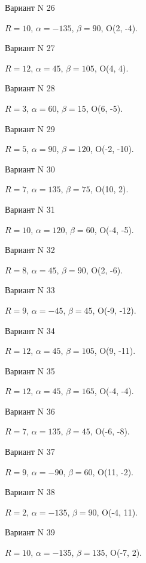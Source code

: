 \documentclass[11pt]{report}
\begin{document}
Вариант N 26

$R = 10$, $\alpha = -135$, $\beta = 90$, O(2, -4).



Вариант N 27

$R = 12$, $\alpha = 45$, $\beta = 105$, O(4, 4).



Вариант N 28

$R = 3$, $\alpha = 60$, $\beta = 15$, O(6, -5).



Вариант N 29

$R = 5$, $\alpha = 90$, $\beta = 120$, O(-2, -10).



Вариант N 30

$R = 7$, $\alpha = 135$, $\beta = 75$, O(10, 2).



Вариант N 31

$R = 10$, $\alpha = 120$, $\beta = 60$, O(-4, -5).



Вариант N 32

$R = 8$, $\alpha = 45$, $\beta = 90$, O(2, -6).



Вариант N 33

$R = 9$, $\alpha = -45$, $\beta = 45$, O(-9, -12).



Вариант N 34

$R = 12$, $\alpha = 45$, $\beta = 105$, O(9, -11).



Вариант N 35

$R = 12$, $\alpha = 45$, $\beta = 165$, O(-4, -4).



Вариант N 36

$R = 7$, $\alpha = 135$, $\beta = 45$, O(-6, -8).



Вариант N 37

$R = 9$, $\alpha = -90$, $\beta = 60$, O(11, -2).



Вариант N 38

$R = 2$, $\alpha = -135$, $\beta = 90$, O(-4, 11).



Вариант N 39

$R = 10$, $\alpha = -135$, $\beta = 135$, O(-7, 2).
\end{document}
